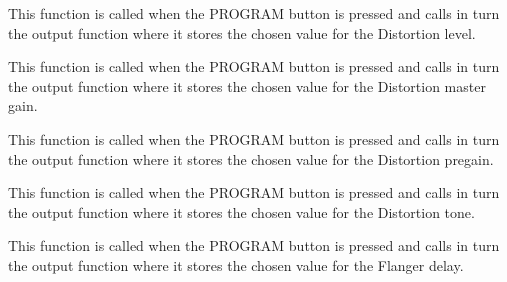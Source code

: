 \documentclass[letterpaper,10pt,english]{sphinxmanual}
\begin{document}

\begin{fulllineitems}
\label{Code:GUI.set_distortionLevel}
This function is called when the PROGRAM button is pressed and calls in turn the output function where it stores the chosen 
value for the Distortion level.

\end{fulllineitems}


\begin{fulllineitems}
\label{Code:GUI.set_distortionMastergain}
This function is called when the PROGRAM button is pressed and calls in turn the output function where it stores the chosen 
value for the Distortion master gain.

\end{fulllineitems}


\begin{fulllineitems}
\label{Code:GUI.set_distortionPregain}
This function is called when the PROGRAM button is pressed and calls in turn the output function where it stores the chosen 
value for the Distortion pregain.

\end{fulllineitems}


\begin{fulllineitems}
\label{Code:GUI.set_distortionTone}
This function is called when the PROGRAM button is pressed and calls in turn the output function where it stores the chosen 
value for the Distortion tone.

\end{fulllineitems}


\begin{fulllineitems}
\label{Code:GUI.set_flangerDelay}
This function is called when the PROGRAM button is pressed and calls in turn the output function where it stores the chosen 
value for the Flanger delay.

\end{fulllineitems}
\end{document}
